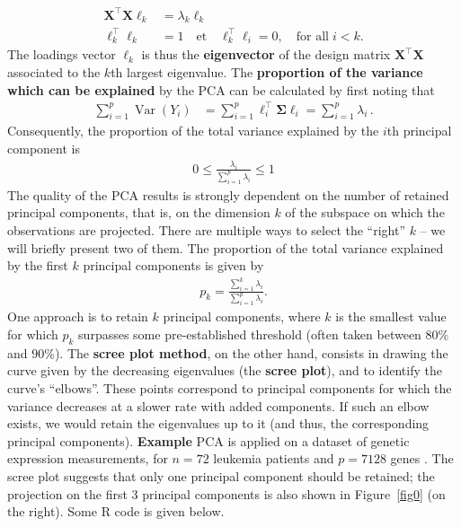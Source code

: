 \documentclass[20pt,landscape,footrule,headrule]{foils}
\newcommand{\newl}{\newline\newline}
\begin{document}
{{\begin{align*}
\mathbf{X}^{\!\top} \mathbf{X} \ell_k&=\lambda_k\ell_k\\
\ell^{\!\top}_k\ell_k&=1 \quad\text{et}\quad\ell^{\!\top}_k\ell_i=0,\quad\text{for all}\; i<k.
\end{align*}
The loadings vector $\ell_k$ is thus the \textbf{eigenvector} of the design matrix $\mathbf{X}^{\!\top} \mathbf{X}$ associated to the $k$th largest eigenvalue. \newl
The \textbf{proportion of the variance which can be explained} by the PCA can be calculated by first noting that 
\begin{align*}
\sum_{i=1}^{p}\operatorname{Var}\left(Y_{i}\right) &=\sum_{i=1}^{p}\ell_{i}^{\!\top} \boldsymbol{\Sigma} \ell_{i}=\sum_{i=1}^{p}\lambda_i \,.
\end{align*}
Consequently, the proportion of the total variance explained by the $i$th principal component is  
\begin{align*}
0\leq \frac{\lambda_i}{\sum_{i=1}^{p}\lambda_i }\leq 1
\end{align*}
The quality of the PCA results is strongly dependent on the number of retained principal components, that is, on the dimension $k$ of the subspace on which the observations are projected. There are multiple ways to select the ``right'' $k$ -- we will briefly present two of them. 
\newl The proportion of the total variance explained by the first $k$ principal components is given by  
\begin{align*}
p_k=\frac{\sum_{i=1}^{k} \lambda_i}{\sum_{i=1}^{p}\lambda_i}.
\end{align*}
One approach is to retain $k$ principal components, where $k$ is the smallest value for which  $p_k$ surpasses some pre-established threshold  (often taken between $80\%$ and $90\%$). \newl
The \textbf{scree plot method}, on the other hand, consists in drawing the curve given by the decreasing eigenvalues (the \textbf{scree plot}), and to identify the curve's ``elbows''. These points correspond to principal components for which the variance decreases at a slower rate with added components. If such an elbow exists, we would retain the eigenvalues up to it (and thus,  the corresponding principal components). 
\textbf{Example}
PCA is applied on a dataset of genetic expression measurements, for $n=72$ leukemia patients and $p=7128$ genes \cite{Hleukemia}. The scree plot suggests that only one principal component should be retained; the projection on the first 3 principal components is also shown in Figure~\ref{fig0} (on the right). Some R code is given below.
}}
\end{document}

